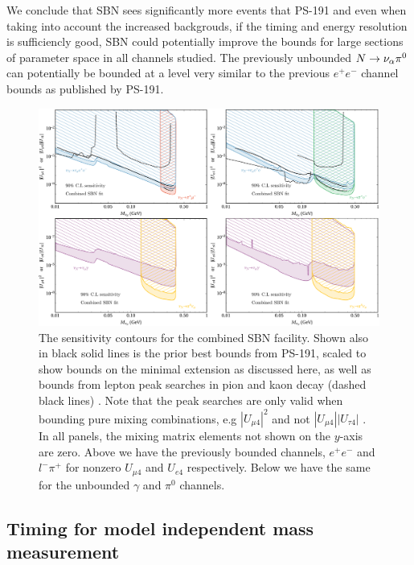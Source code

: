 \documentclass[11pt, a4paper]{article}
\def\ster{\ensuremath N}
\begin{document}
We conclude that SBN sees significantly more events that PS-191 and even when taking into account the increased backgrouds, if the timing and energy resolution is sufficiencly good, SBN could potentially improve the bounds for large sections of parameter space in all
channels studied. The previously unbounded $\ster \rightarrow \nu_\alpha \pi^0$ can potentially be bounded at a level very similar to the previous $e^+ e^-$ channel bounds as published by PS-191.  

\begin{figure}[t]
\center
\includegraphics[width=1.0\textwidth]{figures/band_sbn.pdf}

\caption{\label{fig:band_sbn}The sensitivity contours for the combined SBN
facility. Shown also in black solid lines is the prior best bounds from PS-191,
scaled to show bounds on the minimal extension as discussed here, as well as bounds from lepton peak searches in pion and kaon decay \cite{PhysRevD.46.R885,PhysRevLett.68.3000}(dashed black lines) . Note that the peak searches are only valid when bounding pure mixing combinations, e.g $|U_{\mu 4}|^2$ and not $|U_{\mu 4}||U_{\tau 4}|$ . In all panels, the mixing matrix elements not shown on the $y$-axis are zero. Above we
have the previously bounded channels, $e^+e^-$ and $l^- \pi^+$ for nonzero
$U_{\mu 4}$ and $U_{e4}$ respectively. Below we have the same for the unbounded $\gamma$ and $\pi^0$ channels.}

\end{figure}

\subsection{\label{sec:timing_physics}Timing for model independent mass measurement}
\end{document}
